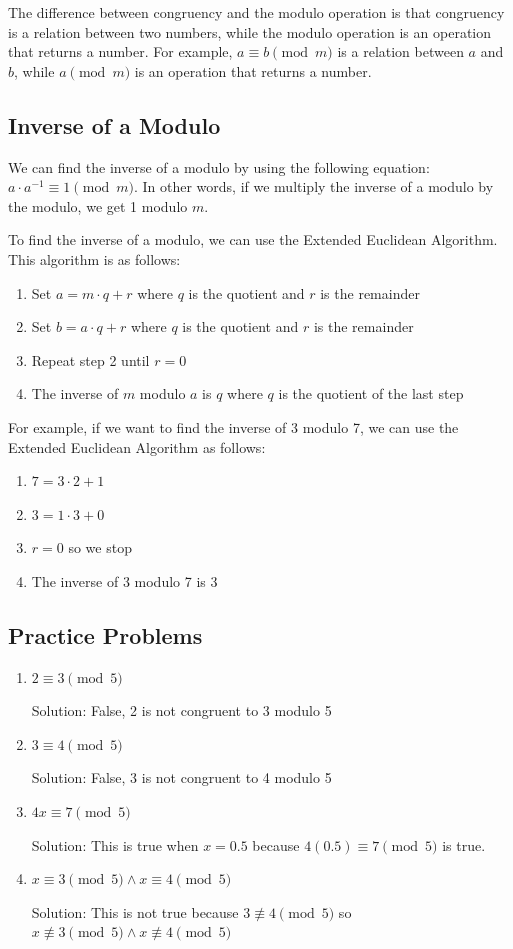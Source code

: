\documentclass[11pt]{article}
\begin{document}
The difference between congruency and the modulo operation is that congruency is a relation between two numbers, while the modulo operation is an operation that returns a number. For example, \(a \equiv b \pmod{m}\) is a relation between \(a\) and \(b\), while \(a \pmod{m}\) is an operation that returns a number.

\subsection{Inverse of a Modulo}
\label{sec:orge827119}
We can find the inverse of a modulo by using the following equation: \(a \cdot a^{-1} \equiv 1 \pmod{m}\). In other words, if we multiply the inverse of a modulo by the modulo, we get 1 modulo \(m\).

To find the inverse of a modulo, we can use the Extended Euclidean Algorithm. This algorithm is as follows:
\begin{enumerate}
\item Set \(a = m \cdot q + r\) where \(q\) is the quotient and \(r\) is the remainder
\item Set \(b = a \cdot q + r\) where \(q\) is the quotient and \(r\) is the remainder
\item Repeat step 2 until \(r = 0\)
\item The inverse of \(m\) modulo \(a\) is \(q\) where \(q\) is the quotient of the last step
\end{enumerate}

For example, if we want to find the inverse of 3 modulo 7, we can use the Extended Euclidean Algorithm as follows:
\begin{enumerate}
\item \(7 = 3 \cdot 2 + 1\)
\item \(3 = 1 \cdot 3 + 0\)
\item \(r = 0\) so we stop
\item The inverse of 3 modulo 7 is 3
\end{enumerate}

\subsection{Practice Problems}
\label{sec:org0c04fd7}
\begin{enumerate}
\item \(2 \equiv 3 \pmod{5}\)

Solution: False, 2 is not congruent to 3 modulo 5

\item \(3 \equiv 4 \pmod{5}\)

Solution: False, 3 is not congruent to 4 modulo 5

\item \(4x \equiv 7 \pmod{5}\)

Solution: This is true when \(x = 0.5\) because \(4(0.5) \equiv 7 \pmod{5}\) is true.

\item \(x \equiv 3 \pmod{5} \land x \equiv 4 \pmod{5}\)

Solution: This is not true because \(3 \not\equiv 4 \pmod{5}\) so \(x \not\equiv 3 \pmod{5} \land x \not\equiv 4 \pmod{5}\)
\end{enumerate}
\end{document}
